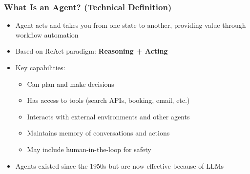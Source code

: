 \begin{frame}[fragile]\frametitle{What Is an Agent? (Technical Definition)}
\begin{itemize}
    \item Agent acts and takes you from one state to another, providing value through workflow automation
    \item Based on ReAct paradigm: \textbf{Reasoning + Acting}
    \item Key capabilities:
    \begin{itemize}
        \item Can plan and make decisions
        \item Has access to tools (search APIs, booking, email, etc.)
        \item Interacts with external environments and other agents
        \item Maintains memory of conversations and actions
        \item May include human-in-the-loop for safety
    \end{itemize}
    \item Agents existed since the 1950s but are now effective because of LLMs
\end{itemize}
\end{frame}

